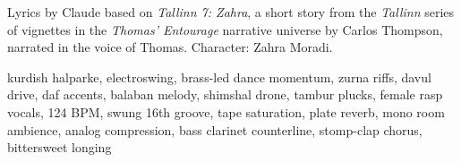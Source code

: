 
\begin{notes}
Lyrics by Claude based on \emph{Tallinn 7: Zahra}, a short story from the \emph{Tallinn} series of vignettes in the \emph{Thomas’ Entourage} narrative universe by Carlos Thompson, narrated in the voice of Thomas. Character: Zahra Moradi.
\end{notes}
\begin{style}
kurdish halparke, electroswing, brass-led dance momentum, zurna riffs, davul drive, daf accents, balaban melody, shimshal drone, tambur plucks, female rasp vocals, 124 BPM, swung 16th groove, tape saturation, plate reverb, mono room ambience, analog compression, bass clarinet counterline, stomp-clap chorus, bittersweet longing
\end{style}
